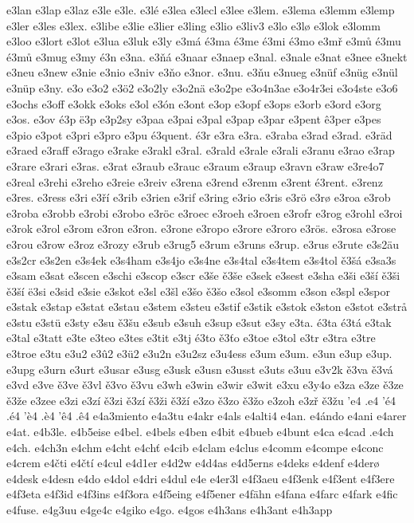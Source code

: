 e3lan
e3lap
e3laz
e3le
e3le.
e3lé
e3lea
e3lecl
e3lee
e3lem.
e3lema
e3lemm
e3lemp
e3ler
e3les
e3lex.
e3libe
e3lie
e3lier
e3ling
e3lio
e3liv3
e3lo
e3lø
e3lok
e3lomm
e3loo
e3lort
e3lot
e3lua
e3luk
e3ly
e3má
é3ma
é3me
é3mi
é3mo
e3mř
e3mů
é3mu
é3mů
e3mug
e3my
é3n
e3na.
e3ňá
e3naar
e3naep
e3nal.
e3nale
e3nat
e3nee
e3nekt
e3neu
e3new
e3nie
e3nio
e3niv
e3ňo
e3nor.
e3nu.
e3ňu
e3nueg
e3nüf
e3nüg
e3nül
e3nüp
e3ny.
e3o
e3o2
e3ö2
e3o2ly
e3o2nä
e3o2pe
e3o4n3ae
e3o4r3ei
e3o4ste
e3o6
e3ochs
e3off
e3okk
e3oks
e3ol
e3ón
e3ont
e3op
e3opf
e3ops
e3orb
e3ord
e3org
e3os.
e3ov
é3p
ë3p
e3p2sy
e3paa
e3pai
e3pal
e3pap
e3par
e3pent
ê3per
e3pes
e3pio
e3pot
e3pri
e3pro
e3pu
é3quent.
é3r
e3ra
e3ra.
e3raba
e3rad
e3rad.
e3räd
e3raed
e3raff
e3rago
e3rake
e3rakl
e3ral.
e3rald
e3rale
e3rali
e3ranu
e3rao
e3rap
e3rare
e3rari
e3ras.
e3rat
e3raub
e3rauc
e3raum
e3raup
e3ravn
e3raw
e3re4o7
e3real
e3rehi
e3reho
e3reie
e3reiv
e3rena
e3rend
e3renm
e3rent
é3rent.
e3renz
e3res.
e3ress
e3ri
e3ří
e3rib
e3rien
e3rif
e3ring
e3rio
e3ris
e3rö
e3rø
e3roa
e3rob
e3roba
e3robb
e3robi
e3robo
e3röc
e3roec
e3roeh
e3roen
e3rofr
e3rog
e3rohl
e3roi
e3rok
e3rol
e3rom
e3ron
e3ron.
e3rone
e3ropo
e3rore
e3roro
e3rös.
e3rosa
e3rose
e3rou
e3row
e3roz
e3rozy
e3rub
e3rug5
e3rum
e3runs
e3rup.
e3rus
e3rute
e3s2äu
e3s2cr
e3s2en
e3s4ek
e3s4ham
e3s4jo
e3s4ne
e3s4tal
e3s4tem
e3s4tol
ě3šá
e3sa3s
e3sam
e3sat
e3scen
e3schi
e3scop
e3scr
e3še
ě3še
e3sek
e3sest
e3sha
e3ši
e3ší
ě3ši
ě3ší
ë3si
e3sid
e3sie
e3skot
e3sl
e3šl
e3šo
ě3šo
e3sol
e3somm
e3son
e3spl
e3spor
e3stak
e3stap
e3stat
e3stau
e3stem
e3steu
e3stif
e3stik
e3stok
e3ston
e3stot
e3strå
e3stu
e3stü
e3sty
e3su
ě3šu
e3sub
e3suh
e3sup
e3sut
e3sy
e3ta.
é3ta
é3tá
e3tak
e3tal
e3tatt
e3te
e3teo
e3tes
e3tit
e3tj
é3to
ě3ťo
e3toe
e3tol
e3tr
e3tra
e3tre
e3troe
e3tu
e3u2
e3û2
e3ü2
e3u2n
e3u2sz
e3u4ess
e3um
e3um.
e3un
e3up
e3up.
e3upg
e3urn
e3urt
e3usar
e3usg
e3usk
e3usn
e3usst
e3uts
e3uu
e3v2k
ě3va
ě3vá
e3vd
e3ve
ě3ve
ě3vl
ě3vo
ě3vu
e3wh
e3win
e3wir
e3wit
e3xu
e3y4o
e3za
e3ze
ě3ze
ě3že
e3zee
e3zi
e3zí
ě3zi
ě3zí
ě3ži
ě3ží
e3zo
ě3zo
ě3žo
e3zoh
e3zř
ě3žu
'e4
.e4
'é4
.é4
'è4
.è4
'ê4
.ê4
e4a3miento
e4a3tu
e4akr
e4als
e4alti4
e4an.
e4ándo
e4ani
e4arer
e4at.
e4b3le.
e4b5eise
e4bel.
e4bels
e4ben
e4bit
e4bueb
e4bunt
e4ca
e4cad
.e4ch
e4ch.
e4ch3n
e4chm
e4cht
e4chť
e4cib
e4clam
e4clus
e4comm
e4compe
e4conc
e4crem
e4čti
e4čtí
e4cul
e4d1er
e4d2w
e4d4as
e4d5erns
e4deks
e4denf
e4derø
e4desk
e4desn
e4do
e4dol
e4dri
e4dul
e4e
e4er3l
e4f3aeu
e4f3enk
e4f3ent
e4f3ere
e4f3eta
e4f3id
e4f3ins
e4f3ora
e4f5eing
e4f5ener
e4fähn
e4fana
e4farc
e4fark
e4fic
e4fuse.
e4g3uu
e4ge4c
e4giko
e4go.
e4gos
e4h3ans
e4h3ant
e4h3app
